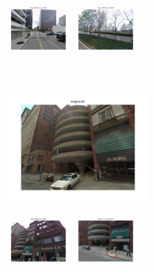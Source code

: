\begin{figure}[t!]
\begin{minipage}{0.75\linewidth}
\begin{minipage}{\linewidth}
                \colorbox{myRed}{\includegraphics[trim = 35mm 30mm 35mm 30mm, clip=true, height=16mm]{imgs/Pval/exImproved03/improved03.jpg}}
                \colorbox{myRed}{\includegraphics[trim = 35mm 30mm 35mm 30mm, clip=true, height=16mm]{imgs/Pval/exImproved03/improved04.jpg}}
            \end{minipage} 
        \end{minipage}
        \vspace{3mm}
        \\
        \begin{minipage}{0.34\linewidth}
            \centering
            \vspace{0mm}
            \includegraphics[trim = 45mm 40mm 45mm 30mm, clip=true, height=36mm]{imgs/Pval/exImproved04/query.jpg}
        \end{minipage}
        \begin{minipage}{0.75\linewidth}
            \begin{minipage}{\linewidth} 
                \colorbox{myGreen}{\includegraphics[trim = 35mm 30mm 35mm 30mm, clip=true, height=16mm]{imgs/Pval/exImproved04/improvedPval01.jpg}}
                \colorbox{myGreen}{\includegraphics[trim = 35mm 30mm 35mm 30mm, clip=true, height=16mm]{imgs/Pval/exImproved04/improvedPval02.jpg}}

\end{minipage}
\end{minipage}
\end{figure}

